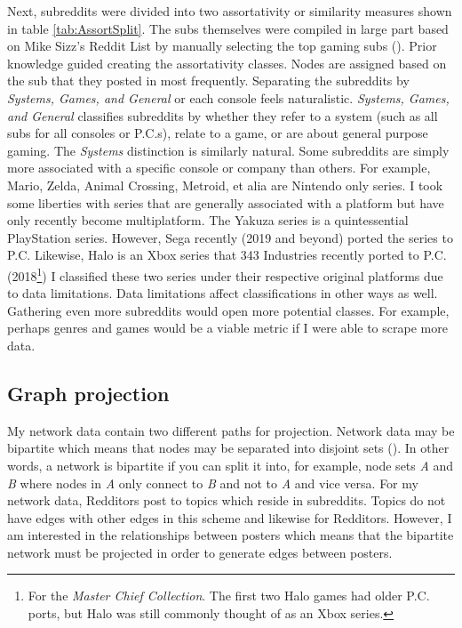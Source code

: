 \documentclass[12pt, a4paper]{article}
\begin{document}
Next, subreddits were divided into two assortativity or similarity measures shown in table \ref{tab:AssortSplit}. The subs themselves were compiled in large part based on Mike Sizz's Reddit List by manually selecting the top gaming subs (\cite{redditlist}). Prior knowledge guided creating the assortativity classes. Nodes are assigned based on the sub that they posted in most frequently. Separating the subreddits by \textit{Systems, Games, and General} or each console feels naturalistic. \textit{Systems, Games, and General} classifies subreddits by whether they refer to a system (such as all subs for all consoles or P.C.s), relate to a game, or are about general purpose gaming. The \textit{Systems} distinction is similarly natural. Some subreddits are simply more associated with a specific console or company than others. For example, Mario, Zelda, Animal Crossing, Metroid, et alia are Nintendo only series. I took some liberties with series that are generally associated with a platform but have only recently become multiplatform. The Yakuza series is a quintessential PlayStation series. However, Sega recently (2019 and beyond) ported the series to P.C. Likewise, Halo is an Xbox series that 343 Industries recently ported to P.C. (2018\footnote{For the \textit{Master Chief Collection}. The first two Halo games had older P.C. ports, but Halo was still commonly thought of as an Xbox series.}) I classified these two series under their respective original platforms due to data limitations. Data limitations affect classifications in other ways as well. Gathering even more subreddits would open more potential classes. For example, perhaps genres and games would be a viable metric if I were able to scrape more data.

\subsection{Graph projection}

My network data contain two different paths for projection. Network data may be bipartite which means that nodes may be separated into disjoint sets (\cite{banerjee2017}). In other words, a network is bipartite if you can split it into, for example, node sets \textit{A} and \textit{B} where nodes in \textit{A} only connect to \textit{B} and not to \textit{A} and vice versa. For my network data, Redditors post to topics which reside in subreddits. Topics do not have edges with other edges in this scheme and likewise for Redditors. However, I am interested in the relationships between posters which means that the bipartite network must be projected in order to generate edges between posters.
\end{document}

